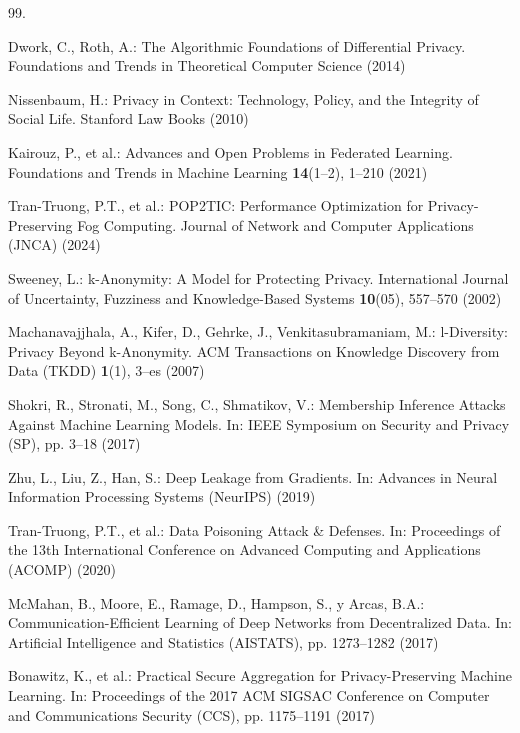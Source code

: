 % 
%

\begin{thebibliography}{99.}%

 Dwork, C., Roth, A.: The Algorithmic Foundations of Differential Privacy. Foundations and Trends in Theoretical Computer Science (2014)

 Nissenbaum, H.: Privacy in Context: Technology, Policy, and the Integrity of Social Life. Stanford Law Books (2010)

 Kairouz, P., et al.: Advances and Open Problems in Federated Learning. Foundations and Trends in Machine Learning \textbf{14}(1--2), 1--210 (2021)

 Tran-Truong, P.T., et al.: POP2TIC: Performance Optimization for Privacy-Preserving Fog Computing. Journal of Network and Computer Applications (JNCA) (2024)

 Sweeney, L.: k-Anonymity: A Model for Protecting Privacy. International Journal of Uncertainty, Fuzziness and Knowledge-Based Systems \textbf{10}(05), 557--570 (2002)

 Machanavajjhala, A., Kifer, D., Gehrke, J., Venkitasubramaniam, M.: l-Diversity: Privacy Beyond k-Anonymity. ACM Transactions on Knowledge Discovery from Data (TKDD) \textbf{1}(1), 3--es (2007)

 Shokri, R., Stronati, M., Song, C., Shmatikov, V.: Membership Inference Attacks Against Machine Learning Models. In: IEEE Symposium on Security and Privacy (SP), pp. 3--18 (2017)

 Zhu, L., Liu, Z., Han, S.: Deep Leakage from Gradients. In: Advances in Neural Information Processing Systems (NeurIPS) (2019)

 Tran-Truong, P.T., et al.: Data Poisoning Attack \& Defenses. In: Proceedings of the 13th International Conference on Advanced Computing and Applications (ACOMP) (2020)

 McMahan, B., Moore, E., Ramage, D., Hampson, S., y Arcas, B.A.: Communication-Efficient Learning of Deep Networks from Decentralized Data. In: Artificial Intelligence and Statistics (AISTATS), pp. 1273--1282 (2017)

 Bonawitz, K., et al.: Practical Secure Aggregation for Privacy-Preserving Machine Learning. In: Proceedings of the 2017 ACM SIGSAC Conference on Computer and Communications Security (CCS), pp. 1175--1191 (2017)


\end{thebibliography}
